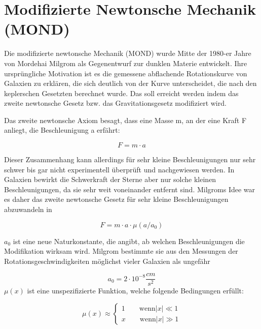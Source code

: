 
\section{Modifizierte Newtonsche Mechanik (MOND)}


Die modifizierte newtonsche Mechanik (MOND) wurde Mitte der 1980-er
Jahre von Mordehai Milgrom als Gegenentwurf zur dunklen Materie
entwickelt. Ihre urspr\"ungliche Motivation ist es die gemessene
abflachende Rotationskurve von Galaxien zu erkl\"aren, die sich
deutlich von der Kurve unterscheidet, die nach den keplerschen
Gesetzten berechnet wurde. Das soll erreicht werden indem das zweite
newtonsche Gesetz bzw. das Gravitationsgesetz modifiziert wird. 


\bigskip


Das zweite newtonsche Axiom besagt, dass eine Masse m, an der eine Kraft
F anliegt, die Beschleunigung a erf\"ahrt: 

\begin{equation}
F=m\cdot a
\end{equation}

Dieser Zusammenhang kann allerdings f\"ur sehr kleine Beschleunigungen
nur sehr schwer bis gar nicht experimentell \"uberpr\"uft und
nachgewiesen werden. In Galaxien bewirkt die Schwerkraft der Sterne
aber nur solche kleinen Beschleunigungen, da sie sehr weit voneinander
entfernt sind. Milgroms Idee \cite{Bekenstein1984} war es daher das zweite newtonsche
Gesetz f\"ur sehr kleine Beschleunigungen abzuwandeln in

\begin{equation}
F=m\cdot a\cdot \mu (a/a_{0})
\end{equation}

 $a_{0}$ ist eine neue Naturkonstante, die angibt, ab welchen
Beschleunigungen die Modifikation wirksam wird. Milgrom bestimmte sie
aus den Messungen der Rotationsgeschwindigkeiten m\"oglichst vieler
Galaxien als ungef\"ahr

\begin{equation*}
a_{0}=2\cdot 10^{-8}\frac{\mathit{cm}}{s^{2}}
\end{equation*}
$\mu (x)$ ist eine unspezifizierte Funktion, welche folgende
Bedingungen erf\"ullt:

\begin{equation*}
\mu \left( x \right) \approx
\begin{cases}
1 \qquad \mathrm{wenn} \left| x \right| \ll 1 \\
x \qquad \mathrm{wenn} \left| x \right| \gg 1 
\end{cases}
\end{equation*}

